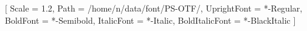 
\usepackage[no-math,no-config]{fontspec}

\newfontfamily{}[
  Scale = 1.2,
  Path = /home/n/data/font/PS-OTF/,
  UprightFont = *-Regular,
  BoldFont = *-Semibold,
  ItalicFont = *-Italic,
  BoldItalicFont = *-BlackItalic
]

\setmainfont{Linux Libertine O}
\setsansfont{Linux Biolinum O}
\setmonofont{Source Code Pro}







